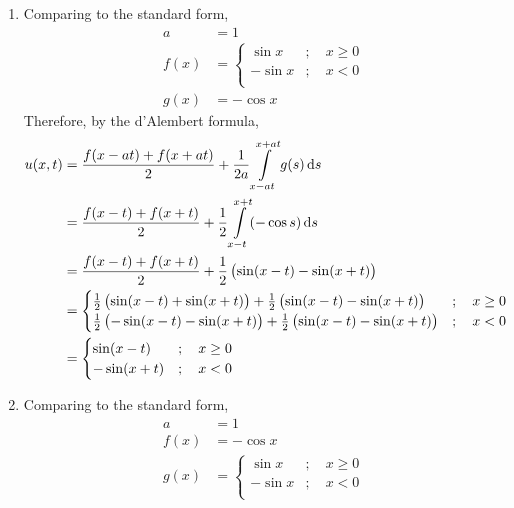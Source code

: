 \documentclass[fleqn, a4paper, 11pt, oneside]{amsart}
\theoremstyle{definition}
\theoremstyle{theorem}
\begin{document}
\begin{solution}
	\begin{enumerate}[leftmargin=*]
		\item
			Comparing to the standard form,
			\begin{align*}
				a &= 1\\
				f(x) &=
					\begin{cases}
						\sin x  & ;\quad x \ge 0 \\
						-\sin x & ;\quad x < 0   \\
					\end{cases}\\
				g(x) &= -\cos x
			\end{align*}
			Therefore, by the d'Alembert formula,
			\begin{align*}
				u(x,t) &= \frac{f(x - a t) + f(x + a t)}{2} + \frac{1}{2 a} \int\limits_{x - a t}^{x + a t} g(s) \dif s\\
				&= \frac{f(x - t) + f(x + t)}{2} + \frac{1}{2} \int\limits_{x - t}^{x + t} (-\cos s) \dif s\\
				&= \frac{f(x - t) + f(x + t)}{2} + \frac{1}{2} \left( \sin(x - t) - \sin(x + t) \right)\\
				&=
					\begin{cases}
						\frac{1}{2} \left( \sin(x - t) + \sin(x + t) \right) + \frac{1}{2} \left( \sin(x - t) - \sin(x + t) \right)  & ;\quad x \ge 0 \\
						\frac{1}{2} \left( -\sin(x - t) - \sin(x + t) \right) + \frac{1}{2} \left( \sin(x - t) - \sin(x + t) \right) & ;\quad x < 0   \\
					\end{cases}\\
				&=
					\begin{cases}
						\sin(x - t)  & ;\quad x \ge 0 \\
						-\sin(x + t) & ;\quad x < 0   \\
					\end{cases}
			\end{align*}
		\item
			Comparing to the standard form,
			\begin{align*}
				a &= 1\\
				f(x) &= -\cos x\\
				g(x) &=
					\begin{cases}
						\sin x  & ;\quad x \ge 0 \\
						-\sin x & ;\quad x < 0   \\
					\end{cases}

\end{align*}
\end{enumerate}
\end{solution}
\end{document}
